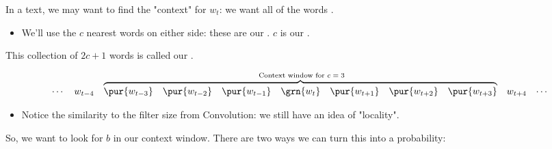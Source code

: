         \begin{definition}
            In a text, we may want to find the "context" for  $w_t$: we want all of the words .

            \begin{itemize}
                \item We'll use the $c$ nearest words on either side: these are our . $c$ is our .
            \end{itemize}

            This collection of $2c+1$ words is called our .

            \begin{equation*}
                \begin{matrix}
                    \cdots & w_{t-4} & 
                    \overbrace{
                    \begin{matrix}
                        \pur{w_{t-3}} & \pur{w_{t-2}} & \pur{w_{t-1}} &
                        \grn{w_t} & 
                        \pur{w_{t+1}} & \pur{w_{t+2}} & \pur{w_{t+3}}
                    \end{matrix} 
                    }^{\text{  Context window for $c=3$}}
                    & w_{t+4} & \cdots
                \end{matrix}
            \end{equation*}
            
        \end{definition}


        \begin{itemize}
            \item Notice the similarity to the filter size from Convolution: we still have an idea of "locality".
        \end{itemize}


        \phantom{}

        So, we want to look for $b$ in our context window. There are two ways we can turn this into a probability:

